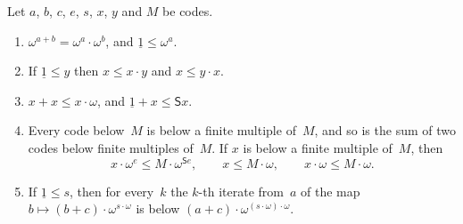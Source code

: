\documentclass[11pt]{amsart}
\makeatletter
\newcommand{\bS}{\mathsf{S}}
\newcommand{\bplus}{\mathbin{+}}
\newcommand{\btimes}{\mathbin{\cdot}}
\newcommand{\num}[1]{\underline{#1}}          %
\newif\ifagdarefs
\newcommand{\AgdaRefs}[1]{\ifagdarefs{\footnotesize\color{agdablue}(#1)}\else\unskip\fi}
\newcommand{\Agda}[2]{{\footnotesize\color{agdablue}\textsf{#1}%
  \ifblank{#2}{}{\texttt{.}\allowbreak\texttt{#2}}}}
\let\ttt@plain\texttt
\renewcommand{\texttt}[1]{{\footnotesize\color{agdablue}\ttt@plain{#1}}}
\theoremstyle{plain}
\theoremstyle{definition}
\makeatother
\begin{document}
\begin{lemma}[Absorption]
\label{lem:absorb}
Let $a$, $b$, $c$, $e$, $s$, $x$, $y$ and $M$ be codes.
\begin{enumerate}
\item\label{item:exp-law}
  $\omega^{a \bplus b} = \omega^{a} \btimes \omega^{b}$, and
  $\num 1 \le \omega^{a}$.
\item\label{item:mult-incr}
  If $\num 1 \le y$ then $x \le x \btimes y$ and $x \le y \btimes x$.
\item\label{item:double}
  $x \bplus x \le x \btimes \omega$, and
  $\num 1 \bplus x \le \bS x$.
\item\label{item:multiple}
  Every code below~$M$ is below a finite multiple of~$M$, and so is the
  sum of two codes below finite multiples of~$M$. If $x$ is below a
  finite multiple of~$M$, then
  \[
    x \btimes \omega^{e} \le M \btimes \omega^{\bS e} , \qquad
    x \le M \btimes \omega , \qquad
    x \btimes \omega \le M \btimes \omega .
  \]
\item\label{item:iterate}
  If $\num 1 \le s$, then for every~$k$ the $k$-th iterate from~$a$ of
  the map $b \mapsto (b \bplus c) \btimes \omega^{s \btimes \omega}$
  is below $(a \bplus c) \btimes
  \omega^{(s \btimes \omega) \btimes \omega}$.
\end{enumerate}
\AgdaRefs{\Agda{BrouwerOrdinals.MultClosure}{ω\^{}⊗}; \texttt{S⊕≤S};
\Agda{BrouwerOrdinals.Epsilon0}{one-≤-ω\^{}}, \texttt{x-≤-x⊗},
\texttt{y-≤-⊗}; \Agda{BrouwerOrdinals.MoveTuple}{dup-ω};
\Agda{BrouwerOrdinals.Absorb}{\_⋖\_}, \texttt{⋖-base}, \texttt{⋖-⊕},
\texttt{ι⊗ω\^{}}, \texttt{⋖-⊗}, \texttt{⋖-⊗ω}, \texttt{⋖-ω};
\Agda{BrouwerOrdinals.MultAffine}{dbl-ω\^{}}, \texttt{crux},
\texttt{orbit-inv}, \texttt{pw-ω\^{}};
\Agda{BrouwerOrdinals.Move}{padMove}, \texttt{move-orbit}.}
\end{lemma}
\end{document}
